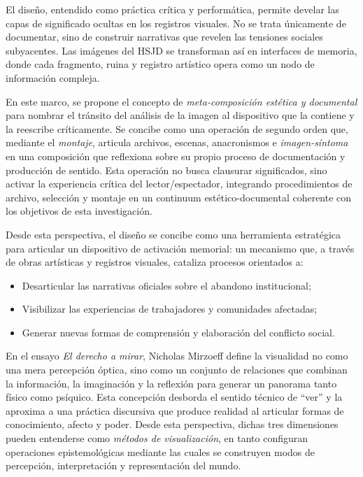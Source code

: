 El diseño, entendido como práctica crítica y performática, permite develar las capas de significado ocultas en los registros visuales. No se trata únicamente de documentar, sino de construir narrativas que revelen las tensiones sociales subyacentes. Las imágenes del HSJD se transforman así en interfaces de memoria, donde cada fragmento, ruina y registro artístico opera como un nodo de información compleja.

\textcolor{edit30sept}{En este marco, se propone el concepto de \textit{meta-composición estética y documental} para nombrar el tránsito del análisis de la imagen al dispositivo que la contiene y la reescribe críticamente. Se concibe como una operación de segundo orden que, mediante el \textit{montaje}, articula archivos, escenas, anacronismos e \textit{imagen-síntoma} en una composición que reflexiona sobre su propio proceso de documentación y producción de sentido. Esta operación no busca clausurar significados, sino activar la experiencia crítica del lector/espectador, integrando procedimientos de archivo, selección y montaje en un continuum estético-documental coherente con los objetivos de esta investigación.}

\textcolor{edit30sept}{Desde esta perspectiva, el diseño se concibe como una herramienta estratégica para articular un dispositivo de activación memorial: un mecanismo que, a través de obras artísticas y registros visuales, cataliza procesos orientados a:}

\begin{itemize}
\item Desarticular las narrativas oficiales sobre el abandono institucional;
\item Visibilizar las experiencias de trabajadores y comunidades afectadas;
\item Generar nuevas formas de comprensión y elaboración del conflicto social.
\end{itemize}

\textcolor{edit30sept}{En el ensayo \textit{El derecho a mirar}, Nicholas Mirzoeff define la visualidad no como una mera percepción óptica, sino como un conjunto de relaciones que combinan la información, la imaginación y la reflexión para generar un panorama tanto físico como psíquico. Esta concepción desborda el sentido técnico de “ver” y la aproxima a una práctica discursiva que produce realidad al articular formas de conocimiento, afecto y poder. Desde esta perspectiva, dichas tres dimensiones pueden entenderse como \textit{métodos de visualización}, en tanto configuran operaciones epistemológicas mediante las cuales se construyen modos de percepción, interpretación y representación del mundo.}

